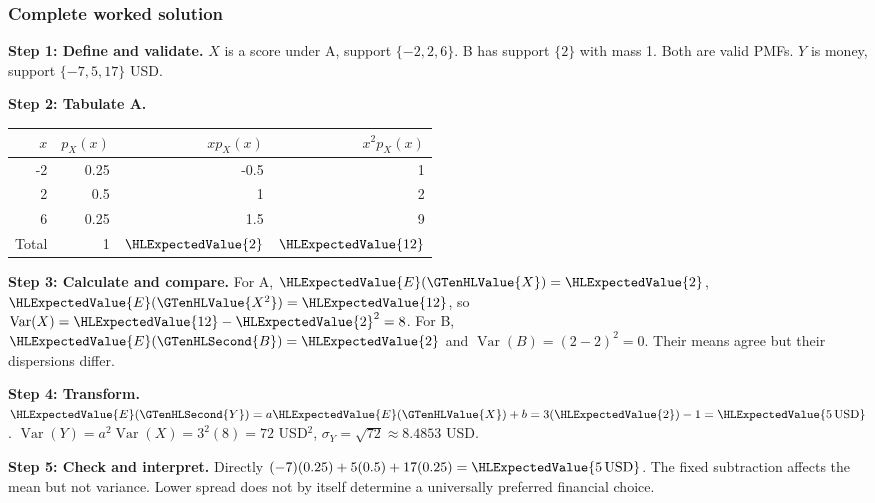 \subsubsection*{Complete worked solution}
\par\noindent\begin{minipage}{\linewidth}
\textbf{Step 1: Define and validate.} $X$ is a score under A, support $\{-2,2,6\}$. B has support $\{2\}$ with mass 1. Both are valid PMFs. $Y$ is money, support $\{-7,5,17\}$ USD.
\end{minipage}\par\medskip
\par\noindent\begin{minipage}{\linewidth}
\textbf{Step 2: Tabulate A.} \begin{center}
\begin{tabular}{rrrr}
\toprule
$x$ & $p_X(x)$ & $xp_X(x)$ & $x^2p_X(x)$ \\ \midrule
-2 & 0.25 & -0.5 & 1 \\
2 & 0.5 & 1 & 2 \\
6 & 0.25 & 1.5 & 9 \\
Total & 1 & $\HLExpectedValue{2}$ & $\HLExpectedValue{12}$ \\
\bottomrule
\end{tabular}
\end{center}

\end{minipage}\par\medskip
\par\noindent\begin{minipage}{\linewidth}
\textbf{Step 3: Calculate and compare.} For A, $\HLExpectedValue{E}(\GTenHLValue{X})=\HLExpectedValue{2}$, $\HLExpectedValue{E}(\GTenHLValue{X^2})=\HLExpectedValue{12}$, so $\operatorname{Var}(X)=\HLExpectedValue{12}-\HLExpectedValue{2}^2=8$. For B, $\HLExpectedValue{E}(\GTenHLSecond{B})=\HLExpectedValue{2}$ and $\operatorname{Var}(B)=(2-2)^2=0$. Their means agree but their dispersions differ.
\end{minipage}\par\medskip
\par\noindent\begin{minipage}{\linewidth}
\textbf{Step 4: Transform.} $\HLExpectedValue{E}(\GTenHLSecond{Y})=a\HLExpectedValue{E}(\GTenHLValue{X})+b=3(\HLExpectedValue{2})-1=\HLExpectedValue{5\,\text{USD}}$. $\operatorname{Var}(Y)=a^2\operatorname{Var}(X)=3^2(8)=72$ USD$^2$, $\sigma_Y=\sqrt{72}\approx8.4853$ USD.
\end{minipage}\par\medskip
\par\noindent\begin{minipage}{\linewidth}
\textbf{Step 5: Check and interpret.} Directly $(-7)(0.25)+5(0.5)+17(0.25)=\HLExpectedValue{5\,\text{USD}}$. The fixed subtraction affects the mean but not variance. Lower spread does not by itself determine a universally preferred financial choice.
\end{minipage}\par\medskip
{}

